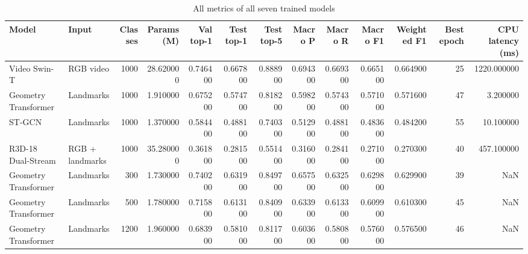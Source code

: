 \begin{table}[htbp]
\caption{All metrics of all seven trained models}
\label{tab:table00_all_models_all_metrics}
\begin{tabular}{llrrrrrrrrrrr}
\toprule
Model & Input & Classes & Params (M) & Val top-1 & Test top-1 & Test top-5 & Macro P & Macro R & Macro F1 & Weighted F1 & Best epoch & CPU latency (ms) \\
\midrule
Video Swin-T & RGB video & 1000 & 28.620000 & 0.746400 & 0.667800 & 0.888900 & 0.694300 & 0.669300 & 0.665100 & 0.664900 & 25 & 1220.000000 \\
Geometry Transformer & Landmarks & 1000 & 1.910000 & 0.675200 & 0.574700 & 0.818200 & 0.598200 & 0.574300 & 0.571000 & 0.571600 & 47 & 3.200000 \\
ST-GCN & Landmarks & 1000 & 1.370000 & 0.584400 & 0.488100 & 0.740300 & 0.512900 & 0.488100 & 0.483600 & 0.484200 & 55 & 10.100000 \\
R3D-18 Dual-Stream & RGB + landmarks & 1000 & 35.280000 & 0.361800 & 0.281500 & 0.551400 & 0.316000 & 0.284100 & 0.271000 & 0.270300 & 40 & 457.100000 \\
Geometry Transformer & Landmarks & 300 & 1.730000 & 0.740200 & 0.631900 & 0.849700 & 0.657500 & 0.632500 & 0.629800 & 0.629900 & 39 & NaN \\
Geometry Transformer & Landmarks & 500 & 1.780000 & 0.715800 & 0.613100 & 0.840900 & 0.633900 & 0.613300 & 0.609900 & 0.610300 & 45 & NaN \\
Geometry Transformer & Landmarks & 1200 & 1.960000 & 0.683900 & 0.581000 & 0.811700 & 0.603600 & 0.580800 & 0.576000 & 0.576500 & 46 & NaN \\
\bottomrule
\end{tabular}
\end{table}
